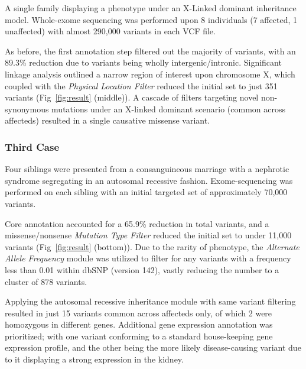 \documentclass{bioinfo}
\begin{document}
A single family displaying a phenotype under an X-Linked dominant inheritance model. Whole-exome sequencing was performed upon 8 individuals (7 affected, 1 unaffected) with almost 290,000 variants in each VCF file. 

As before, the first annotation step filtered out the majority of variants, with an 89.3\% reduction due to variants being wholly intergenic/intronic. Significant linkage analysis outlined a narrow region of interest upon chromosome X, which coupled with the \textit{Physical Location Filter} reduced the initial set to just 351 variants (Fig~\ref{fig:result} (middle)). A cascade of filters targeting novel non-synonymous mutations under an X-linked dominant scenario (common across affecteds) resulted in a single causative missense variant.


\subsubsection{Third Case}

Four siblings were presented from a consanguineous marriage with a nephrotic syndrome segregating in an autosomal recessive fashion. Exome-sequencing was performed on each sibling with an initial targeted set of approximately 70,000 variants.

Core annotation accounted for a 65.9\% reduction in total variants, and a missense/nonsense \textit{Mutation Type Filter} reduced the initial set to under 11,000 variants (Fig~\ref{fig:result} (bottom)). Due to the rarity of phenotype, the \textit{Alternate Allele Frequency} module was utilized  to filter for any variants with a frequency less than 0.01 within dbSNP (version 142), vastly reducing the number to a cluster of 878 variants.

Applying the autosomal recessive inheritance module with same variant filtering resulted in just 15 variants common across affecteds only, of which 2 were homozygous in different genes. Additional gene expression annotation was prioritized; with one variant conforming to a standard house-keeping gene expression profile, and the other being the more likely disease-causing variant due to it displaying a strong expression in the kidney.
\end{document}
